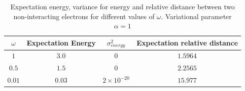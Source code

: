 \documentclass[10pt]{article}
\begin{document}
\begin{table}[h!]
  \caption{Expectation energy, variance for energy and relative distance between two non-interacting electrons for different values of $\omega$. Variational parameter $\alpha =1$}
  \label{tab:one}
  \begin{center}
    \begin{tabular}{c|c|c|c}
    \hline
		$\omega$& Expectation Energy & $\sigma^2_{energy}$   & Expectation relative distance  \\
    \hline
	$	1 $  &  $3.0$ & $0$ & $1.5964$  \\
	$	0.5$   &$1.5$ & $0$& $2.2565$   \\
	$	0.01$   & $0.03$ &$2\times  10^{-20}$ &  $15.977$   \\
	\end{tabular}
  \end{center}
\end{table}
\end{document}
